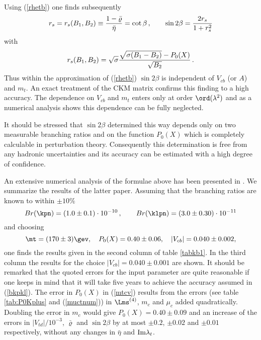 Using (\ref{rhetb}) one finds subsequently \cite{BB4}
\begin{equation}\label{sin}
r_s=r_s(B_1, B_2)\equiv{1-\bar\varrho\over\bar\eta}=\cot\beta\,, \qquad
\sin 2\beta=\frac{2 r_s}{1+r^2_s}
\end{equation}
with
\begin{equation}\label{cbb}
r_s(B_1, B_2)=\sqrt{\sigma}{\sqrt{\sigma(B_1-B_2)}-P_0(X)\over\sqrt{B_2}}\,.
\end{equation}
Thus within the approximation of (\ref{rhetb}) $\sin 2\beta$ is
independent of $V_{cb}$ (or $A$) and $m_t$. An exact treatment of
the CKM matrix confirms this finding to a high accuracy. The
dependence on $V_{cb}$ and $m_t$ enters only at order
$\ord(\lambda^2)$ and as a numerical analysis shows this
dependence can be fully neglected.

It should be stressed that $\sin 2\beta$ determined this way depends
only on two measurable branching ratios and on the function
$P_0(X)$ which is completely calculable in perturbation theory.
Consequently this determination is free from any hadronic
uncertainties and its accuracy can be estimated with a high degree
of confidence. 

An extensive numerical analysis of the formulae above has been presented
in \cite{BB4,BB96}. We summarize the results of the latter paper.
Assuming that the branching ratios are known to within $\pm 10\%$
\begin{equation}\label{bkpkl}
Br(\kpn)=(1.0\pm 0.1)\cdot 10^{-10}\,,\qquad
Br(\klpn)=(3.0\pm 0.30)\cdot 10^{-11}
\end{equation}
and choosing 
\begin{equation}\label{mtcv}
\mt=(170\pm 3)\gev,\quad P_0(X)=0.40\pm0.06,\quad
|V_{cb}|=0.040\pm 0.002,
\end{equation}
one finds the results given in the second column of table 
\ref{tabkb1}.
In the third column the results for the choice
$|V_{cb}|=0.040\pm 0.001$ are shown.
It should be remarked that the quoted errors for the input parameter
are quite reasonable if one keeps in mind
that it will take  five years to achieve the accuracy
assumed in (\ref{bkpkl}). The error in $P_0(X)$ in (\ref{mtcv}) 
results from the errors (see table \ref{tab:P0Kplus} and (\ref{muctnum})) 
in $\Lms^{(4)}$, $m_c$ and $\mu_c$ added quadratically.
Doubling the error in $m_c$ would give $P_0(X)=0.40\pm 0.09$ and
an increase of the errors in $|V_{td}|/10^{-3}$, $\bar\varrho$ and
$\sin 2\beta$ by at most $\pm 0.2$, $\pm 0.02$ and $\pm 0.01$
respectively, without any changes in $\bar\eta$ and 
${\rm Im}\lambda_t$.

